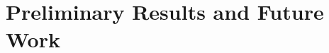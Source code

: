 \documentclass[10pt, oneside]{article}
\theoremstyle{definition}
\theoremstyle{definition}
\begin{document}

    


\section{Preliminary Results and Future Work}
\end{document}
